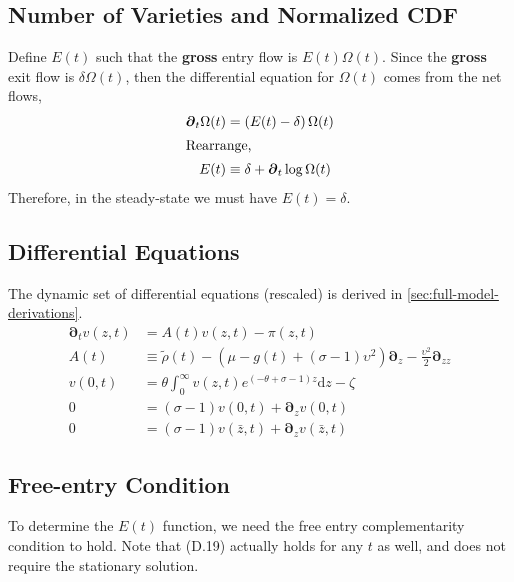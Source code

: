 \documentclass[11pt]{article}
\newcommand{\D}[1][]{\ensuremath{\boldsymbol{\partial}_{#1}}}
\newcommand{\diff}{\ensuremath{\mathrm{d}}}
\begin{document}
\subsection{Number of Varieties and Normalized CDF}

Define $E(t)$ such that the \textbf{gross} entry flow is $E(t)\Omega(t)$.  Since the \textbf{gross} exit flow is $\delta \Omega(t)$, then the differential equation for $\Omega(t)$ comes from the net flows,
\begin{align}
	\D[t] \Omega(t) &= \left(E(t) - \delta \right)\Omega(t)\\
\intertext{Rearrange,}
E(t) &\equiv \delta + \D[t]\log \Omega(t)
\end{align}	
Therefore, in the steady-state we must have $E(t) = \delta$.

\subsection{Differential Equations}\label{sec:full-ODE}
The dynamic set of differential equations (rescaled) is derived in \cref{sec:full-model-derivations}.
\begin{align}
	\D[t]v(z,t) &= A(t)v(z,t) - \pi(z,t) \\	
	A(t) &\equiv \tilde{\rho}(t)  - (\mu - g(t) + (\sigma - 1)\upsilon^2)\D[z] - \frac{\upsilon^2}{2}\D[zz]\\
	v(0,t) &= \theta \int_{0}^{\infty}v(z,t) e^{(-\theta + \sigma - 1)z} \diff z - \zeta\label{eq:normalized-vm-summary-rescaled}\\
	0 &= (\sigma - 1)v(0,t) + \D[z]v(0,t)\label{eq:normalized-sp-summary-rescaled}\\
	0 &= (\sigma - 1)v(\bar{z},t) + \D[z]v(\bar{z},t)\label{eq:normalized-rhs-summary-rescaled}
\end{align}


\subsection{Free-entry Condition}\label{sec:free-entry}
To determine the $E(t)$ function, we need the free entry complementarity condition to hold.  Note that (D.19) actually holds for any $t$ as well, and does not require the stationary solution.
\end{document}
